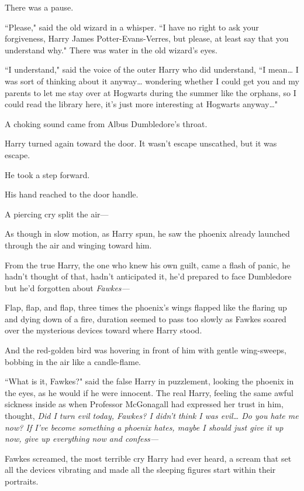 There was a pause.

``Please," said the old wizard in a whisper. ``I have no right to ask your forgiveness, Harry James Potter-Evans-Verres, but please, at least say that you understand why." There was water in the old wizard's eyes.

``I understand," said the voice of the outer Harry who did understand, ``I mean{\ldots} I was sort of thinking about it anyway{\ldots} wondering whether I could get you and my parents to let me stay over at Hogwarts during the summer like the orphans, so I could read the library here, it's just more interesting at Hogwarts anyway{\ldots}"

A choking sound came from Albus Dumbledore's throat.

Harry turned again toward the door. It wasn't escape unscathed, but it was escape.

He took a step forward.

His hand reached to the door handle.

A piercing cry split the air---

As though in slow motion, as Harry spun, he saw the phoenix already launched through the air and winging toward him.

From the true Harry, the one who knew his own guilt, came a flash of panic, he hadn't thought of that, hadn't anticipated it, he'd prepared to face Dumbledore but he'd forgotten about \emph{Fawkes---}

Flap, flap, and flap, three times the phoenix's wings flapped like the flaring up and dying down of a fire, duration seemed to pass too slowly as Fawkes soared over the mysterious devices toward where Harry stood.

And the red-golden bird was hovering in front of him with gentle wing-sweeps, bobbing in the air like a candle-flame.

``What is it, Fawkes?" said the false Harry in puzzlement, looking the phoenix in the eyes, as he would if he were innocent. The real Harry, feeling the same awful sickness inside as when Professor McGonagall had expressed her trust in him, thought, \emph{Did I turn evil today, Fawkes? I didn't think I was evil{\ldots} Do you hate me now? If I've become something a phoenix hates, maybe I should just give it up now, give up everything now and confess---}

Fawkes screamed, the most terrible cry Harry had ever heard, a scream that set all the devices vibrating and made all the sleeping figures start within their portraits.

